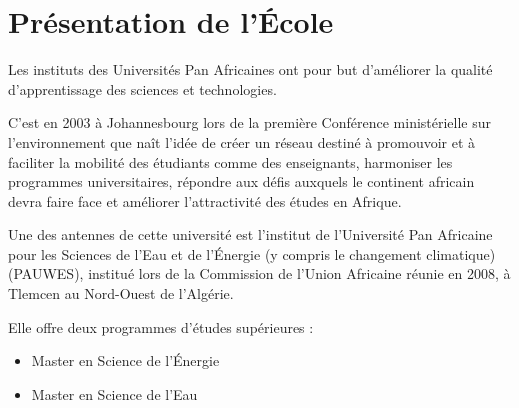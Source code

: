 \documentclass[oneside]{report}
\begin{document}
	\chapter{Présentation de l'École}
	{
		\vspace{2cm}
		\par Les instituts des Universités Pan Africaines ont pour but d’améliorer la qualité d'apprentissage des sciences et technologies.
		\vspace{1cm}
		\par C’est en 2003 à Johannesbourg lors de la première Conférence ministérielle sur l’environnement que naît l’idée de créer un réseau destiné à promouvoir et à faciliter la mobilité des étudiants comme des enseignants, harmoniser les programmes universitaires, répondre aux défis auxquels le continent africain devra faire face et améliorer l’attractivité des études en Afrique.
		\vspace{1cm}
		\par Une des antennes de cette université est l’institut de l'Université Pan Africaine pour les Sciences de l’Eau et de l'Énergie (y compris le changement climatique) (PAUWES), institué lors de la Commission de l’Union Africaine réunie en 2008, à Tlemcen au Nord-Ouest de l’Algérie. 
		\vspace{1cm}
		\par Elle offre deux programmes d’études supérieures :
		\begin{itemize}
			\item{Master en Science de l’Énergie}
			\item{Master en Science de l’Eau}
		\end{itemize}
	}
\end{document}
